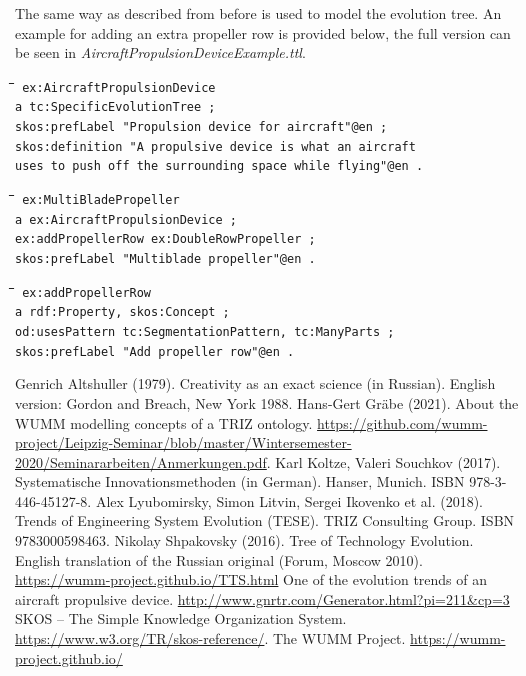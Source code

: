 \documentclass[11pt,a4paper]{article}
\newenvironment{code}{\tt \begin{tabbing}
\hskip12pt\=\hskip12pt\=\hskip12pt\=\hskip12pt\=\hskip5cm\=\hskip5cm\=\kill}
{\end{tabbing}}
\begin{document}
The same way as described from before is used to model the evolution tree. An example for adding an extra propeller row is provided below, the full version can be seen in \textit{AircraftPropulsionDeviceExample.ttl}.

\begin{code}\tt
ex:AircraftPropulsionDevice \\
\> a tc:SpecificEvolutionTree ; \\
\> skos:prefLabel "Propulsion device for aircraft"@en ; \\
\> skos:definition "A propulsive device is what an aircraft \\
\>\> uses to push off the surrounding space while flying"@en .
\end{code}
\begin{code}\tt
ex:MultiBladePropeller \\
\> a ex:AircraftPropulsionDevice ; \\
\> ex:addPropellerRow ex:DoubleRowPropeller ; \\
\> skos:prefLabel "Multiblade propeller"@en .
\end{code}
\begin{code}\tt
ex:addPropellerRow \\
\> a rdf:Property, skos:Concept ; \\
\> od:usesPattern tc:SegmentationPattern, tc:ManyParts ; \\
\> skos:prefLabel "Add propeller row"@en .
\end{code}

\begin{thebibliography}{xxx}
\raggedright
{} Genrich Altshuller (1979).  Creativity as an exact
  science (in Russian). English version: Gordon and Breach, New York 1988.
 Hans-Gert Gr\"abe (2021). About the WUMM modelling
  concepts of a TRIZ ontology.  \url{https://github.com/wumm-project/Leipzig-Seminar/blob/master/Wintersemester-2020/Seminararbeiten/Anmerkungen.pdf}.
 Karl Koltze, Valeri Souchkov (2017).  Systematische
  Innovationsmethoden (in German).  Hanser, Munich. ISBN 978-3-446-45127-8.
 Alex Lyubomirsky, Simon Litvin, Sergei Ikovenko et al.
  (2018). Trends of Engineering System Evolution (TESE).  TRIZ Consulting
  Group. ISBN 9783000598463.
 Nikolay Shpakovsky (2016). Tree of Technology
  Evolution. English translation of the Russian original (Forum, Moscow
  2010).\\ \url{https://wumm-project.github.io/TTS.html}
 One of the evolution trends of an aircraft propulsive device. \url{http://www.gnrtr.com/Generator.html?pi=211&cp=3}
 SKOS -- The Simple Knowledge Organization System.
  \url{https://www.w3.org/TR/skos-reference/}.  
 The WUMM Project. \url{https://wumm-project.github.io/} 
\end{thebibliography}
\end{document}
